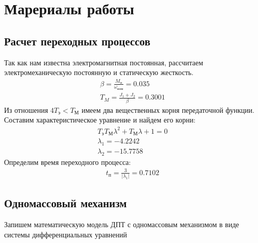 \section{Марериалы работы}
\subsection{Расчет переходных процессов}
Так как нам известна электромагнитная постоянная, рассчитаем электромеханическую постоянную и статическую жесткость.
\begin{gather*}
    \beta = \frac{M_\text{п}}{\omega_\text{ном}}=0.035\\
    T_M = \frac{J_1+J_2}{\beta} = 0.3001
\end{gather*}
Из отношения $4T_\text{э}<T_\text{М}$ имеем два вещественных корня передаточной функции.
Составим характеристическое уравнение и найдем его корни:
\begin{gather*}
    T_\text{э}T_\text{М}\lambda^2+ T_\text{М}\lambda + 1 = 0\\
    \lambda_1 =   -4.2242\\
    \lambda_2 =    -15.7758
\end{gather*}
Определим время переходного процесса:
\begin{gather*}
    t_\text{п} = \frac{3}{|\lambda_1|} = 0.7102
\end{gather*}
\newpage
\subsection{Одномассовый механизм}
Запишем математическую модель ДПТ с одномассовым механизмом в виде системы дифференциальных уравнений

